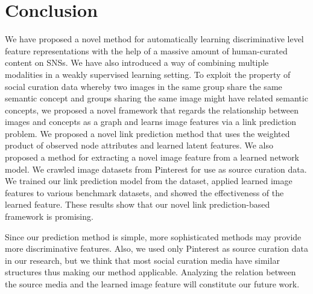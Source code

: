 \documentclass[letterpaper]{article} %
\begin{document}
\section{Conclusion}
\label{sec:conclude}

We have proposed a novel method for automatically learning discriminative level feature representations with the help of a massive amount of human-curated content on SNSs.
We have also introduced a way of combining multiple modalities in a weakly supervised learning setting.
To exploit the property of social curation data whereby two images in the same group share the same semantic concept and groups sharing the same image might have related semantic concepts, we proposed a novel framework that regards the relationship between images and concepts as a graph and learns image features via a link prediction problem.
We proposed a novel link prediction method that uses the weighted product of observed node attributes and learned latent features.
We also proposed a method for extracting a novel image feature from a learned network model.
We crawled image datasets from Pinterest for use as source curation data.
We trained our link prediction model from the dataset, applied learned image features to various benchmark datasets, and showed the effectiveness of the learned feature.
These results show that our novel link prediction-based framework is promising.

Since our prediction method is simple, more sophisticated methods may provide more discriminative features.
Also, we used only Pinterest as source curation data in our research, but we think that most social curation media have similar structures thus making our method applicable.
Analyzing the relation between the source media and the learned image feature will constitute our future work.





\end{document}
